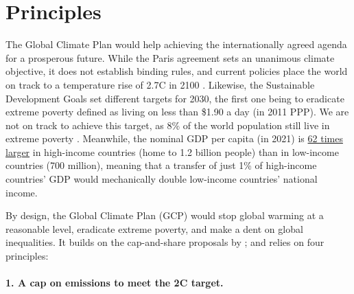 \documentclass[12pt,english]{article}
\begin{document}
\section{Principles}\label{sec:principles}
The Global Climate Plan would help achieving the internationally agreed agenda for a prosperous future. While the Paris agreement sets an unanimous climate objective, it does not establish binding rules, and current policies place the world on track to a temperature rise of 2.7\textdegree{}C in 2100 \citep{climate_action_tracker_warming_2022}. Likewise, the Sustainable Development Goals set different targets for 2030, the first one being to eradicate extreme poverty defined as living on less than \$1.90 a day (in 2011 PPP). We are not on track to achieve this target, as 8\% of the world population still live in extreme poverty \citep{un_sustainable_2022}. Meanwhile, the nominal GDP per capita (in 2021) is \href{https://data.worldbank.org/indicator/NY.GDP.PCAP.CD?end=2021&locations=EU-ZG-XD-XM-1W-IN-US-CD-BI-LU-CN&start=2021&view=bar}{62 times larger} in high-income countries (home to 1.2 billion people) than in low-income countries (700 million), meaning that a transfer of just 1\% of high-income countries' GDP would mechanically double low-income countries' national income. 

By design, the Global Climate Plan (GCP) would stop global warming at a reasonable level, eradicate extreme poverty, and make a dent on global inequalities. It builds on the cap-and-share proposals by \citet{grubb_greenhouse_1990}; \citet{feasta_cap_2008} and relies on four principles:
\paragraph*{1. A cap on emissions to meet the 2\textdegree{}C target.} 
\end{document}
